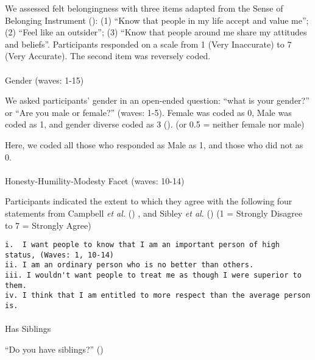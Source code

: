 \documentclass[
  singlecolumn]{article}
\makeatletter
\let\oldparagraph\paragraph
\renewcommand{\paragraph}{
    \@ifstar
      \xxxParagraphStar
      \xxxParagraphNoStar
  }
\newcommand{\xxxParagraphStar}[1]{\oldparagraph*{#1}\mbox{}}
\newcommand{\xxxParagraphNoStar}[1]{\oldparagraph{#1}\mbox{}}
\makeatother
\begin{document}
We assessed felt belongingness with three items adapted from the Sense
of Belonging Instrument (): (1) ``Know that people in my life accept and value me''; (2)
``Feel like an outsider''; (3) ``Know that people around me share my
attitudes and beliefs''. Participants responded on a scale from 1 (Very
Inaccurate) to 7 (Very Accurate). The second item was reversely coded.

\paragraph{Gender (waves: 1-15)}\label{gender-waves-1-15}

We asked participants' gender in an open-ended question: ``what is your
gender?'' or ``Are you male or female?'' (waves: 1-5). Female was coded
as 0, Male was coded as 1, and gender diverse coded as 3
(). (or 0.5
= neither female nor male)

Here, we coded all those who responded as Male as 1, and those who did
not as 0.

\paragraph{Honesty-Humility-Modesty Facet (waves:
10-14)}\label{honesty-humility-modesty-facet-waves-10-14}

Participants indicated the extent to which they agree with the following
four statements from Campbell \emph{et al.}
() , and Sibley \emph{et al.}
() (1 = Strongly Disagree to 7 = Strongly
Agree)

\begin{verbatim}
i.  I want people to know that I am an important person of high status, (Waves: 1, 10-14)
ii. I am an ordinary person who is no better than others.
iii. I wouldn't want people to treat me as though I were superior to them.
iv. I think that I am entitled to more respect than the average person is.
\end{verbatim}

\paragraph{Has Siblings}\label{has-siblings}

``Do you have siblings?'' ()
\end{document}
